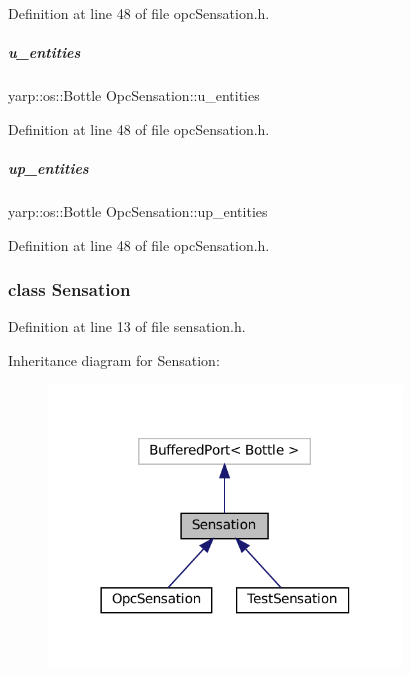 Definition at line 48 of file opc\+Sensation.\+h.

\mbox{\label{group__sensationManager_af6c950377f1c046dd2d2ff4d62e82951}} 
\subparagraph{\texorpdfstring{u\+\_\+entities}{u\_entities}}
{\footnotesize\ttfamily yarp\+::os\+::\+Bottle Opc\+Sensation\+::u\+\_\+entities}



Definition at line 48 of file opc\+Sensation.\+h.

\mbox{\label{group__sensationManager_a89d9a34431cd7948ac619bfd1f4734eb}} 
\subparagraph{\texorpdfstring{up\+\_\+entities}{up\_entities}}
{\footnotesize\ttfamily yarp\+::os\+::\+Bottle Opc\+Sensation\+::up\+\_\+entities}



Definition at line 48 of file opc\+Sensation.\+h.

\label{classSensation}
\subsubsection{class Sensation}


Definition at line 13 of file sensation.\+h.



Inheritance diagram for Sensation\+:
\nopagebreak
\begin{figure}[H]
\begin{center}
\leavevmode
\includegraphics[width=266pt]{classSensation__inherit__graph}
\end{center}
\end{figure}
